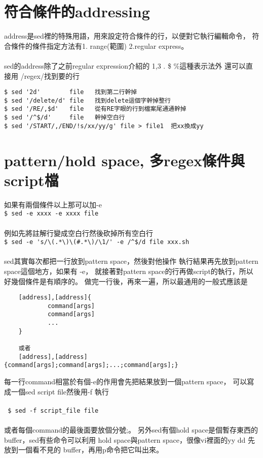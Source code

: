     \section{符合條件的addressing}
    address是sed裡的特殊用語，用來設定符合條件的行，以便對它執行編輯命令，
    符合條件的條件指定方法有1. range(範圍) 2.regular express。
    \\\\
    sed的address除了之前regular expression介紹的
    1,3 . \$ \%這種表示法外  還可以直接用 /regex/找到要的行
    \begin{verbatim}
$ sed '2d'        file   找到第二行幹掉
$ sed '/delete/d' file   找到delete這個字幹掉整行
$ sed '/RE/,$d'   file   從有RE字眼的行到檔案尾通通幹掉 
$ sed '/^$/d'     file   幹掉空白行
$ sed '/START/,/END/!s/xx/yy/g' file > file1  把xx換成yy
    \end{verbatim}

    \section{pattern/hold space, 多regex條件與script檔}
    如果有兩個條件以上那可以加-e \\
    \verb=$ sed -e xxxx -e xxxx file= \\\\
    例如先將註解行變成空白行然後砍掉所有空白行 \\
    \verb=$ sed -e 's/\(.*\)\(#.*\)/\1/' -e /^$/d file xxx.sh = \\\\
    sed其實每次都把一行放到pattern space，然後對他操作
    執行結果再先放到pattern space這個地方，如果有 -e，
    就接著對pattern space的行再做script的執行，所以好幾個條件是有順序的。
    做完一行後，再來一遍，所以最通用的一般式應該是\\
    \begin{verbatim}
    [address],[address]{
            command[args]
            command[args]
            ...
    }

    或者
    [address],[address]{command[args];command[args];...;command[args];}

    \end{verbatim}
    每一行command相當於有個-e的作用會先把結果放到一個pattern space，
    可以寫成一個sed script file然後用-f 執行 \\\\
    \verb= $ sed -f script_file file =  \\\\
    或者每個command的最後面要放個分號;。
    另外sed有個hold space是個暫存東西的buffer，sed有些命令可以利用
    hold space與pattern space，很像vi裡面的yy dd 先放到一個看不見的
    buffer，再用p命令把它叫出來。

